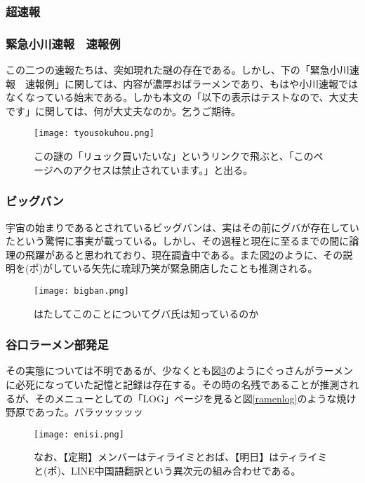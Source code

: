 \subsubsection{超速報}
\subsubsection{緊急小川速報　速報例}
この二つの速報たちは、突如現れた謎の存在である。しかし、下の「緊急小川速報　速報例」に関しては、内容が濃厚おばラーメンであり、もはや小川速報ではなくなっている始末である。しかも本文の「以下の表示はテストなので、大丈夫です」に関しては、何が大丈夫なのか。乞うご期待。
\begin{figure}[H]
  \centering
  \texttt{[image: tyousokuhou.png]}
  \caption{この謎の「リュック買いたいな」というリンクで飛ぶと、「このページへのアクセスは禁止されています。」と出る。}
\label{tyousokuhou}
\end{figure}

\subsubsection{ビッグバン}
宇宙の始まりであるとされているビッグバンは、実はその前にグバが存在していたという驚愕に事実が載っている。しかし、その過程と現在に至るまでの間に論理の飛躍があると思われており、現在調査中である。また図\ref{bigban}のように、その説明を(ポ)がしている矢先に琉球乃笑が緊急開店したことも推測される。

\begin{figure}[H]
  \centering
  \texttt{[image: bigban.png]}
  \caption{はたしてこのことについてグバ氏は知っているのか}
\label{bigban}
\end{figure}


\subsubsection{谷口ラーメン部発足}
その実態については不明であるが、少なくとも図\ref{enisi}のようにぐっさんがラーメンに必死になっていた記憶と記録は存在する。その時の名残であることが推測されるが、そのメニューとしての「LOG」ページを見ると図\ref{ramenlog}のような焼け野原であった。バラッッッッッ

\begin{figure}[H]
  \centering
  \texttt{[image: enisi.png]}
  \caption{なお、【定期】メンバーはティライミとおば、【明日】はティライミと(ポ)、LINE中国語翻訳という異次元の組み合わせである。}
\label{enisi}
\end{figure}

